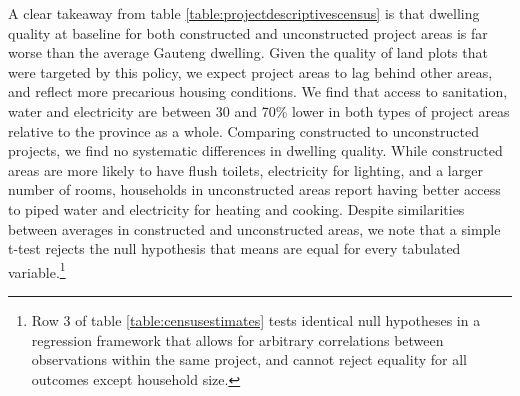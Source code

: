 \documentclass[12pt]{article}
\begin{document}
A clear takeaway from table \ref{table:projectdescriptivescensus} is that dwelling quality at baseline for both constructed and unconstructed project areas is far worse than the average Gauteng dwel\-ling. Given the quality of land plots that were targeted by this policy, we expect project areas to lag behind other areas, and reflect more precarious housing conditions. We find that access to sanitation, water and electricity are between 30 and 70\% lower in both types of project areas relative to the province as a whole. Comparing constructed to unconstructed projects, we find no systematic differences in dwelling quality. While constructed areas are more likely to have flush toilets, electricity for lighting, and a larger number of rooms, households in unconstructed areas report having better access to piped water and electricity for heating and cooking. Despite similarities between averages in constructed and unconstructed areas, we note that a simple t-test rejects the null hypothesis that means are equal for every tabulated variable.\footnote{Row 3 of table \ref{table:censusestimates} tests identical null hypotheses in a regression framework that allows for arbitrary correlations between observations within the same project, and cannot reject equality for all outcomes except household size.}
\end{document}
